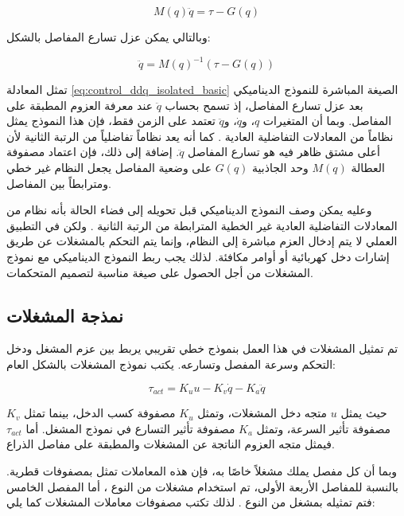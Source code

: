 \begin{equation}
M(q)\ddot{q} = \tau - G(q)
\end{equation}

وبالتالي يمكن عزل تسارع المفاصل بالشكل:

\begin{equation}
\ddot{q} = M(q)^{-1}\left(\tau - G(q)\right)
\label{eq:control_ddq_isolated_basic}
\end{equation}

تمثل المعادلة \eqref{eq:control_ddq_isolated_basic} الصيغة المباشرة للنموذج الديناميكي بعد عزل تسارع المفاصل، إذ تسمح بحساب \(\ddot{q}\) عند معرفة العزوم المطبقة على المفاصل. وبما أن المتغيرات \(q\)، و\(\dot{q}\)، و\(\ddot{q}\) تعتمد على الزمن فقط، فإن هذا النموذج يمثل نظاماً من المعادلات التفاضلية العادية . كما أنه يعد نظاماً تفاضلياً من الرتبة الثانية  لأن أعلى مشتق ظاهر فيه هو تسارع المفاصل \(\ddot{q}\). إضافة إلى ذلك، فإن اعتماد مصفوفة العطالة \(M(q)\) وحد الجاذبية \(G(q)\) على وضعية المفاصل يجعل النظام غير خطي  ومترابطاً  بين المفاصل.

وعليه يمكن وصف النموذج الديناميكي قبل تحويله إلى فضاء الحالة بأنه نظام من المعادلات التفاضلية العادية غير الخطية المترابطة من الرتبة الثانية . ولكن في التطبيق العملي لا يتم إدخال العزم مباشرة إلى النظام، وإنما يتم التحكم بالمشغلات عن طريق إشارات دخل كهربائية أو أوامر مكافئة. لذلك يجب ربط النموذج الديناميكي مع نموذج المشغلات من أجل الحصول على صيغة مناسبة لتصميم المتحكمات.

\subsection{نمذجة المشغلات}

تم تمثيل المشغلات في هذا العمل بنموذج خطي تقريبي يربط بين عزم المشغل ودخل التحكم وسرعة المفصل وتسارعه. يكتب نموذج المشغلات بالشكل العام:

\begin{equation}
\tau_{act}=K_u u-K_v\dot{q}-K_a\ddot{q}
\label{eq:control_actuator_model}
\end{equation}

حيث يمثل \(u\) متجه دخل المشغلات، وتمثل \(K_u\) مصفوفة كسب الدخل، بينما تمثل \(K_v\) مصفوفة تأثير السرعة، وتمثل \(K_a\) مصفوفة تأثير التسارع في نموذج المشغل. أما \(\tau_{act}\) فيمثل متجه العزوم الناتجة عن المشغلات والمطبقة على مفاصل الذراع.

وبما أن كل مفصل يملك مشغلاً خاصًا به، فإن هذه المعاملات تمثل بمصفوفات قطرية. بالنسبة للمفاصل الأربعة الأولى، تم استخدام مشغلات من النوع ، أما المفصل الخامس فتم تمثيله بمشغل من النوع . لذلك تكتب مصفوفات معاملات المشغلات كما يلي:

